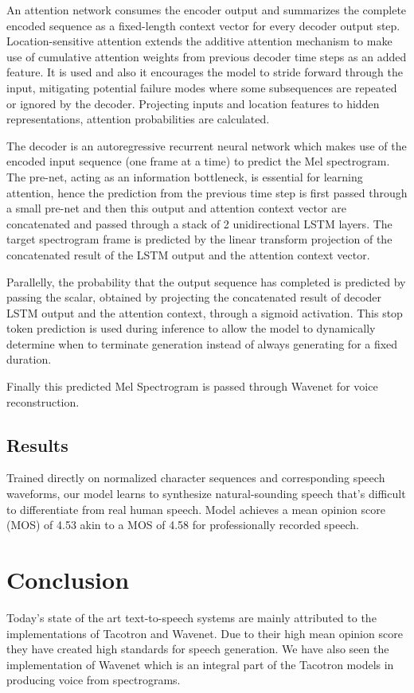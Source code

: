 \documentclass[runningheads]{llncs}
\begin{document}
An attention network consumes the encoder output and summarizes the complete encoded sequence as a fixed-length context vector for every decoder output step. Location-sensitive attention extends the additive attention mechanism to make use of cumulative attention weights from previous decoder time steps as an added feature. It is used and also it encourages the model to stride forward through the input, mitigating potential failure modes where some subsequences are repeated or ignored by the decoder. Projecting inputs and location features to hidden representations, attention probabilities are calculated.  

The decoder is an autoregressive recurrent neural network which makes use of the encoded input sequence (one frame at a time) to predict the Mel spectrogram. The pre-net, acting as an information bottleneck, is essential for learning attention, hence the prediction from the previous time step is first passed through a small pre-net and then this output and attention context vector are concatenated and passed through a stack of 2 unidirectional LSTM layers. The target spectrogram frame is predicted by the linear transform projection of the concatenated result of the LSTM output and the attention context vector. 

Parallelly, the probability that the output sequence has completed is predicted by passing the scalar, obtained by projecting the concatenated result of decoder LSTM output and the attention context, through a sigmoid activation. This stop token prediction is used during inference to allow the model to dynamically determine when to terminate generation instead of always generating for a fixed duration.  

Finally this predicted Mel Spectrogram is passed through Wavenet for voice reconstruction.

\subsection{Results}
Trained directly on normalized character sequences and corresponding speech waveforms, our model learns to synthesize natural-sounding speech that's difficult to differentiate from real human speech. Model achieves a mean opinion score (MOS) of 4.53 akin to a MOS of 4.58 for professionally recorded speech.\cite{ref_paper5}

\section{Conclusion}
Today's state of the art text-to-speech systems are mainly attributed to the implementations of Tacotron and Wavenet. Due to their high mean opinion score they have created high standards for speech generation. We have also seen the implementation of Wavenet which is an integral part of the Tacotron models in producing voice from spectrograms.
\end{document}
